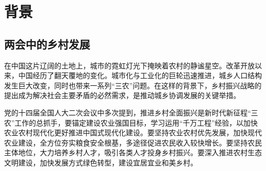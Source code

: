 \chapter{背景}
\label{chapter:introduction}
\section{两会中的乡村发展}
在中国这片辽阔的土地上，城市的霓虹灯光下掩映着农村的静谧星空。改革开放以来，中国经历了翻天覆地的变化。城市化与工业化的巨轮迅速推进，城乡人口结构发生巨大改变，同时也带来一系列“三农”问题。在这样的背景下，乡村振兴战略的提出成为解决社会主要矛盾的必然需求，是推动城乡协调发展的关键举措。

党的十四届全国人大二次会议中多次提到，推进乡村全面振兴是新时代新征程“三农”工作的总抓手，要锚定建设农业强国目标，学习运用“千万工程”经验，以加快农业农村现代化更好推进中国式现代化建设。要坚持农业农村优先发展，加快现代农业建设，全方位夯实粮食安全根基，多途径促进农民收入较快增长。要坚持农民主体地位，大力培养乡村人才，吸引各类人才投身乡村振兴。要深入推进农村生态文明建设，加快发展方式绿色转型，建设宜居宜业和美乡村。

